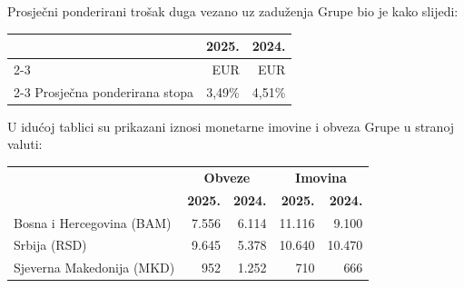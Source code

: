 \documentclass[a4paper,10pt]{article}
\begin{document}
\vspace{3em}
Prosječni ponderirani trošak duga vezano uz zaduženja Grupe bio je kako slijedi:

\vspace{1em}
{\small
\begin{tabular}{@{}p{7cm}rr@{}}
 & 2025. & 2024. \\ \cline{2-3}
 & EUR & EUR \\ \cline{2-3}
Prosječna ponderirana stopa & 3,49\% & 4,51\% \\
\end{tabular}}

\vspace{3em}
U idućoj tablici su prikazani iznosi monetarne imovine i obveza Grupe u stranoj valuti:

\vspace{1em}
{\small
\begin{tabular}{@{}p{5cm}rrrr@{}}
 & \multicolumn{2}{c}{\textbf{Obveze}\hspace{0.8cm}} & \multicolumn{2}{c}{\textbf{Imovina}} \\
 & \textbf{2025.} & \textbf{2024.} & \textbf{2025.} & \textbf{2024.} \\ \hline
Bosna i Hercegovina (BAM) & 7.556 & 6.114 & 11.116 & 9.100 \\
Srbija (RSD) & 9.645 & 5.378 & 10.640 & 10.470 \\
Sjeverna Makedonija (MKD) & 952 & 1.252 & 710 & 666 \\
\end{tabular}}
\end{document}
